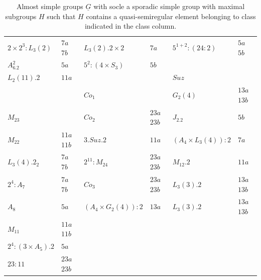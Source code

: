 \documentclass{article}
\theoremstyle{remark}
\theoremstyle{definition}
\newcommand{\qsre}{quasi-semiregular element}
\begin{document}
\begin{table}
\begin{tabular}{ | l| l || l | l|| l| l|}
$2\times 2^3:L_3(2)$        & $7a$ $7b$         & $L_3(2).2\times 2$     & $7a$              & $5^{1+2}:(24:2)$  & $5a$ $5b$ \\
$A_6.2^2 $                  & $5a$              & $5^2:(4\times S_3) $   & $5b$              &  &  \\
$L_2(11).2$                 & $11a$             &                        &                   & \underline{$Suz$} &  \\
                            &                   & \underline{$Co_1$}     &                   & $G_2(4)$  & $13a$ $13b$ \\
\underline{$M_{23}$}        &                   & $Co_2$                 & $23a$ $23b$       & $J_2.2$  & $5b$ \\
$M_{22}$                    & $11a$ $11b$       & $3.Suz.2 $             & $11a$             & $(A_4\times L_3(4)):2$  & $7a$ \\
$L_3(4).2_2$                & $7a$ $7b$         & $2^{11}:M_{24} $       & $23a$ $23b$       & $M_{12}.2 $ & $11a$ \\
$2^4:A_7$                   & $7a$ $7b$         & $Co_3 $                & $23a$ $23b$       & $L_3(3).2 $ & $13a$ $13b$ \\
$A_8$                       & $5a$              & $(A_4\times G_2(4)):2 $ & $13a$            & $L_3(3).2 $ & $13a$ $13b$ \\
$M_{11}$                    & $11a$ $11b$       &                        &                   &  &  \\
$2^4:(3\times A_5).2$       & $5a$              &                        &                   &  &  \\
$23:11$                     & $23a$ $23b$       &                        &                   &  &  \\
\hline
\end{tabular}
    \caption{Almost simple groups $\underline{G}$  with socle a sporadic simple group with maximal subgroups $H$ such that $H$ contains a {\qsre} belonging to class indicated in the class column.}
    \label{tab:spor2}
\end{table}
\end{document}
